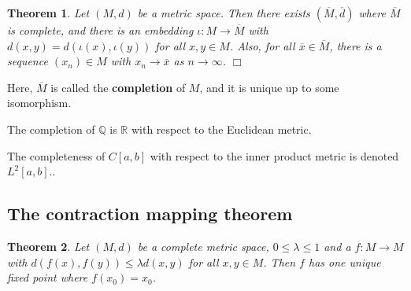 \documentclass[letter-paper]{tufte-book}
\newtheorem{theorem}{\color{pastel-blue}Theorem}[section]
\newenvironment{example}[1][Example]{\begin{trivlist}
\item[\hskip \labelsep {\bfseries #1}]}{\end{trivlist}}
\newcommand{\qedwhite}{\hfill \ensuremath{\Box}}
\begin{document}
\begin{theorem}
  Let $(M, d)$ be a metric space. Then there exists $(\overline{M},
  \overline{d})$ where $\overline{M}$ is complete, and there is an embedding
  $\iota : M \to \overline{M}$ with $d(x,y) = d(\iota(x), \iota(y))$ for all $x,
  y \in M$. Also, for all $\overline{x} \in \overline{M}$, there is a sequence
  $(x_n) \in M$ with $x_n \to \overline{x}$ as $n \to \infty$. \qedwhite
\end{theorem}

Here, $\overline{M}$ is called the \textbf{completion} of $M$, and it is unique
up to some isomorphism.

\begin{example}
  The completion of $\mathbb{Q}$ is $\mathbb{R}$ with respect to the Euclidean
  metric.
  
  The completeness of $C[a,b]$ with respect to the inner product metric is
  denoted $L^2[a,b]$..
\end{example}


\subsection{The contraction mapping theorem}

\begin{theorem}
  Let $(M,d)$ be a complete metric space, $0\leq\lambda\leq1$ and a $f: M\to M$
  with $d(f(x), f(y)) \leq \lambda d(x,y)$ for all $x,y\in M$. Then $f$ has one
  unique fixed point where $f(x_0) = x_0$.
\end{theorem}
\end{document}
